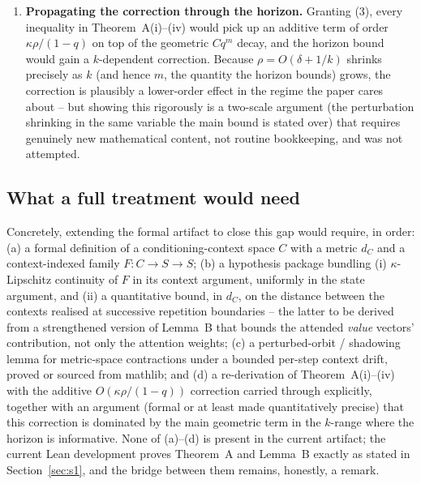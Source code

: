 \documentclass[11pt]{article}
\begin{document}
\begin{enumerate}
  form for this setting, and instantiating or proving it was out of scope for
  this artifact.
\item \textbf{Propagating the correction through the horizon.} Granting (3),
  every inequality in Theorem~A(i)--(iv) would pick up an additive term of
  order $\kappa\rho/(1-q)$ on top of the geometric $Cq^m$ decay, and the
  horizon bound would gain a $k$-dependent correction. Because
  $\rho = O(\delta+1/k)$ shrinks precisely as $k$ (and hence $m$, the quantity
  the horizon bounds) grows, the correction is plausibly a lower-order effect
  in the regime the paper cares about -- but showing this rigorously is a
  two-scale argument (the perturbation shrinking in the same variable the
  main bound is stated over) that requires genuinely new mathematical content,
  not routine bookkeeping, and was not attempted.
\end{enumerate}

\subsection{What a full treatment would need}

Concretely, extending the formal artifact to close this gap would require, in
order: (a) a formal definition of a conditioning-context space $C$ with a
metric $d_C$ and a context-indexed family $F : C \to S \to S$; (b) a
hypothesis package bundling (i) $\kappa$-Lipschitz continuity of $F$ in its
context argument, uniformly in the state argument, and (ii) a quantitative
bound, in $d_C$, on the distance between the contexts realised at successive
repetition boundaries -- the latter to be derived from a strengthened version
of Lemma~B that bounds the attended \emph{value} vectors' contribution, not
only the attention weights; (c) a perturbed-orbit / shadowing lemma for
metric-space contractions under a bounded per-step context drift, proved or
sourced from mathlib; and (d) a re-derivation of Theorem~A(i)--(iv) with the
additive $O(\kappa\rho/(1-q))$ correction carried through explicitly, together
with an argument (formal or at least made quantitatively precise) that this
correction is dominated by the main geometric term in the $k$-range where the
horizon is informative. None of (a)--(d) is present in the current artifact;
the current Lean development proves Theorem~A and Lemma~B exactly as stated
in Section~\ref{sec:s1}, and the bridge between them remains, honestly, a
remark.

\end{document}
